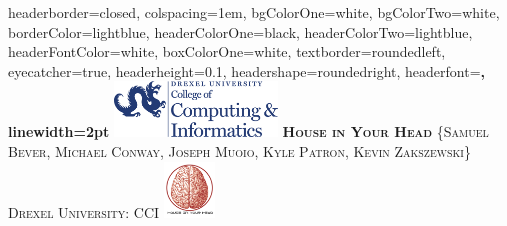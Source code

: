 \documentclass[landscape,a0paper,fontscale=0.285]{baposter} %
\begin{document}
\begin{poster}
{
headerborder=closed, %
colspacing=1em, %
bgColorOne=white, %
bgColorTwo=white, %
borderColor=lightblue, %
headerColorOne=black, %
headerColorTwo=lightblue, %
headerFontColor=white, %
boxColorOne=white, %
textborder=roundedleft, %
eyecatcher=true, %
headerheight=0.1\textheight, %
headershape=roundedright, %
headerfont=\Large\bf\textsc, %
linewidth=2pt %
}
%
{\includegraphics[height=4em]{drexel.png}} %
{\bf\textsc{House in Your Head}\vspace{0.5em}} %
{\textsc{\{Samuel Bever, Michael Conway, Joseph Muoio, Kyle Patron, Kevin Zakszewski\} \hspace{12pt} Drexel University: CCI}} %
{\includegraphics[height=4em]{logo.png}} %



\end{poster}
\end{document}
